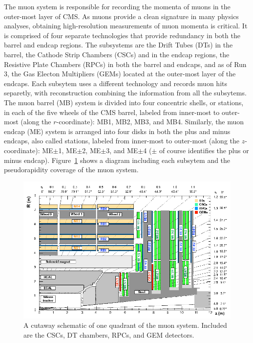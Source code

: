 The muon system \cite{MuonTDR} is responsible for recording the momenta of muons in the outer-most layer of CMS. As muons provide a clean signature in many physics analyses, obtaining high-resolution measurements of muon momenta is critical. It is comprised of four separate technologies that provide redundancy in both the barrel and endcap regions. The subsystems are the Drift Tubes (DTs) in the barrel, the Cathode Strip Chambers (CSCs) and in the endcap regions, the Resistive Plate Chambers (RPCs) in both the barrel and endcaps, and as of Run 3, the Gas Electon Multipliers (GEMs) located at the outer-most layer of the endcaps. Each subsytem uses a different technology and records muon hits separetly, with reconstruction combining the information from all the subsytems. The muon barrel (MB) system is divided into four concentric shells, or stations, in each of the five wheels of the CMS barrel, labeled from inner-most to outer-most (along the $r$-coordinate): MB1, MB2, MB3, and MB4. Similarly, the muon endcap (ME) system is arranged into four disks in both the plus and minus endcaps, also called stations, labeled from inner-most to outer-most (along the $z$-coordinate): ME$\pm$1, ME$\pm$2, ME$\pm$3, and ME$\pm$4 ($\pm$ of course identifies the plus or minus endcap). Figure~\ref{fig:MuonSystem} shows a diagram including each subsytem and the pseudorapidity coverage of the muon system.

\begin{figure}[H]
    \centering
    \includegraphics[width=1\textwidth]{Images/CMS/MuonSystem.png}
    \caption{A cutaway schematic of one quadrant of the muon system. Included are the CSCs, DT chambers, RPCs, and GEM detectors.}
    \label{fig:MuonSystem}
\end{figure}

